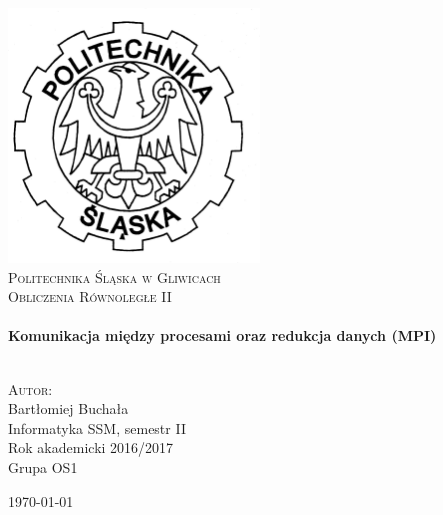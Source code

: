 \begin{titlepage}
		\begin{center}
			
			\includegraphics[width=0.5\textwidth]{./img/logo.png}~\\[1cm]
			
			\textsc{\LARGE Politechnika Śląska w Gliwicach}\\[1.5cm]
			
			\textsc{\Large Obliczenia Równoległe II}\\[0.5cm]
			
			\HRule \\[0.4cm]
			{ \huge \bfseries Komunikacja między procesami oraz redukcja danych (MPI) \\[0.4cm] }
			
			\HRule \\[1.5cm]
			
			\textsc{\Large Autor:} \\
			Bartłomiej Buchała \\
			[1.0cm]
			Informatyka SSM, semestr II \\
			Rok akademicki 2016/2017 \\
			Grupa OS1
			
			\vfill
			
			{\large \today}
			
		\end{center}
\end{titlepage}